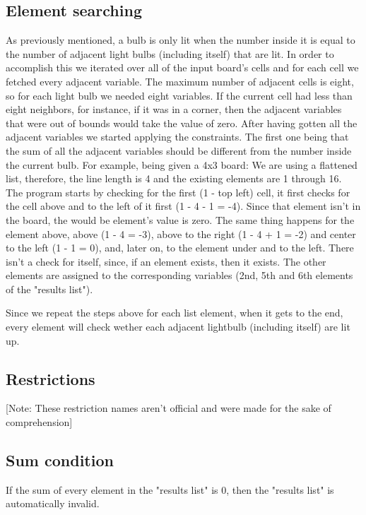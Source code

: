 \documentclass[runningheads]{llncs}
\begin{document}
\subsection{Element searching}
As previously mentioned, a bulb is only lit when the number inside it is equal to the number of adjacent light bulbs (including itself) that are lit. In order to accomplish this we iterated over all of the input board's cells and for each cell we fetched every adjacent variable. The maximum number of adjacent cells is eight, so for each light bulb we needed eight variables. If the current cell had less than eight neighbors, for instance, if it was in a corner, then the adjacent variables that were out of bounds would take the value of zero.\hfill \break
After having gotten all the adjacent variables we started applying the constraints. The first one being that the sum of all the adjacent variables should be different from the number inside the current bulb.\hfill \break
For example, being given a 4x3 board:\hfill \break
We are using a flattened list, therefore, the line length is 4 and the existing elements are 1 through 16.\hfill \break
The program starts by checking for the first (1 - top left) cell, it first checks for the cell above and to the left of it first (1 - 4 - 1 = -4). Since that element isn't in the board, the would be element's value is zero.\hfill \break
The same thing happens for the element above, above (1 - 4 = -3), above to the right (1 - 4 + 1 = -2) and center to the left (1 - 1 = 0), and, later on, to the element under and to the left.\hfill \break
There isn't a check for itself, since, if an element exists, then it exists.\hfill \break
The other elements are assigned to the corresponding variables (2nd, 5th and 6th elements of the "results list").\hfill \break

Since we repeat the steps above for each list element, when it gets to the end, every element will check wether each adjacent lightbulb (including itself) are lit up.


\clearpage
\subsection{Restrictions}
[Note: These restriction names aren't official and were made for the sake of comprehension]\hfill \break
\subsection*{Sum condition}
If the sum of every element in the "results list" is 0, then the "results list" is automatically invalid.
\end{document}
